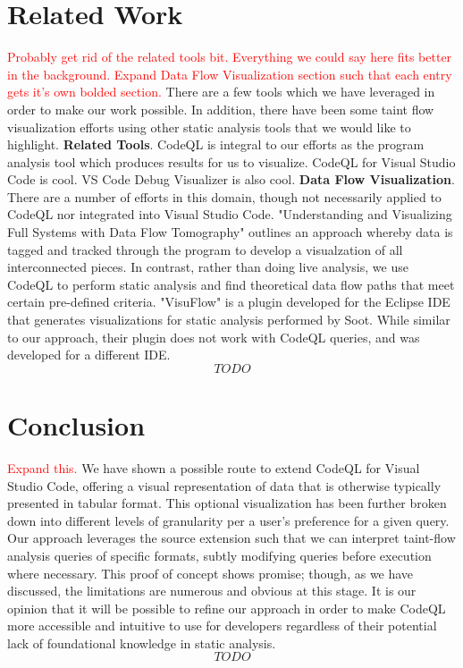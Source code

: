 \documentclass[sigplan,10pt,review]{acmart}
\begin{document}
\section{Related Work}
\textcolor{red}{Probably get rid of the related tools bit. Everything we could say here fits better in the background. Expand Data Flow Visualization section such that each entry gets it's own bolded section.\newline}
There are a few tools which we have leveraged in order to make our work possible. In addition, there have been some taint flow visualization efforts using other static analysis tools that we would like to highlight.
\newline
\newline
\indent \textbf{Related Tools}. CodeQL is integral to our efforts as the program analysis tool which produces results for us to visualize. CodeQL for Visual Studio Code is cool. VS Code Debug Visualizer is also cool.
\newline
\newline
\indent \textbf{Data Flow Visualization}. There are a number of efforts in this domain, though not necessarily applied to CodeQL nor integrated into Visual Studio Code. "Understanding and Visualizing Full Systems with
Data Flow Tomography" outlines an approach whereby data is tagged and tracked through the program to develop a visualzation of all interconnected pieces. In contrast, rather than doing live analysis, we use CodeQL to perform static analysis and find theoretical data flow paths that meet certain pre-defined criteria. "VisuFlow" is a plugin developed for the Eclipse IDE that generates visualizations for static analysis performed by Soot. While similar to our approach, their plugin does not work with CodeQL queries, and was developed for a different IDE.
\[TODO\] 

\section{Conclusion}
\textcolor{red}{Expand this.\newline}
We have shown a possible route to extend CodeQL for Visual Studio Code, offering a visual representation of data that is otherwise typically presented in tabular format. This optional visualization has been further broken down into different levels of granularity per a user's preference for a given query. Our approach leverages the source extension such that we can interpret taint-flow analysis queries of specific formats, subtly modifying queries before execution where necessary.
\newline
\indent
This proof of concept shows promise; though, as we have discussed, the limitations are numerous and obvious at this stage. It is our opinion that it will be possible to refine our approach in order to make CodeQL more accessible and intuitive to use for developers regardless of their potential lack of foundational knowledge in static analysis.
\[TODO\]
\end{document}
